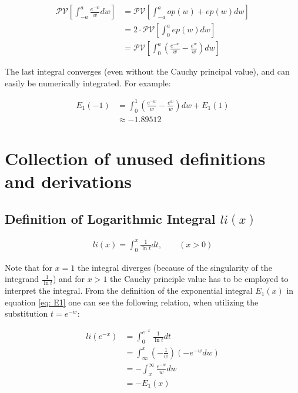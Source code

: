 \documentclass[bibliography=totocnumbered]{scrartcl}
\newcommand{\assume}[1][\text{MISSING PARAMETER}]{,\qquad\left(#1\right)}
\begin{document}
	\begin{align}
		\mathcal{PV}\left[\int_{-a}^{a}\frac{e^{-w}}{w}dw\right]&=\mathcal{PV}\left[\int_{-a}^{a}op\left(w\right)+ep\left(w\right)dw\right]\\
		&=2\cdot\mathcal{PV}\left[\int_{0}^{a}ep\left(w\right)dw\right]\\
		&=\mathcal{PV}\left[\int_{0}^{a}\left(\frac{e^{-w}}{w}-\frac{e^w}{w}\right)dw\right]
	\end{align}

	The last integral converges (even without the Cauchy principal value), and can easily be numerically integrated. For example:

	\begin{align}
		E_1\left(-1\right)&=\int_{0}^{1}\left(\frac{e^{-w}}{w}-\frac{e^w}{w}\right)dw+E_1\left(1\right)\\
		&\approx-1.89512
	\end{align}

	\clearpage
	\printbibliography
	\clearpage
	\appendix

	\section{Collection of unused definitions and derivations}

		\subsection[Definition of Logarithmic Integral]{Definition of Logarithmic Integral $li\left(x\right)$}
		\label{appsubsec: li}

			\begin{gather}
				li\left(x\right)=\int_{0}^{x}\frac{1}{\ln{t}}dt\assume[x>0]\label{eq: li}
			\end{gather}

			Note that for $x=1$ the integral diverges (because of the singularity of the integrand $\frac{1}{\ln{t}}$) and for $x>1$ the Cauchy principle value has to be employed to interpret the integral. From the definition of the exponential integral $E_1\left(x\right)$ in equation \eqref{eq: E1} one can see the following relation, when utilizing the substitution $t=e^{-w}$:

			\begin{align}
				li\left(e^{-x}\right)&=\int_{0}^{e^{-x}}\frac{1}{\ln{t}}dt\\
				&=\int_{\infty}^{x}\left(-\frac{1}{w}\right)\left(-e^{-w}dw\right)\\
				&=-\int_{x}^{\infty}\frac{e^{-w}}{w}dw\\
				&=-E_1\left(x\right)
			\end{align}
\end{document}
